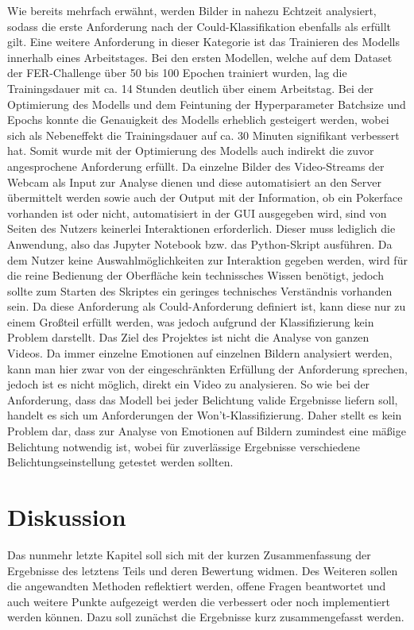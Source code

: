 \documentclass[12pt, a4paper]{report}
\begin{document}
Wie bereits mehrfach erwähnt, werden Bilder in nahezu Echtzeit analysiert, sodass die erste Anforderung nach der Could-Klassifikation ebenfalls als erfüllt gilt. Eine weitere Anforderung in dieser Kategorie ist das Trainieren des Modells innerhalb eines Arbeitstages. Bei den ersten Modellen, welche auf dem Dataset der FER-Challenge über 50 bis 100 Epochen trainiert wurden, lag die Trainingsdauer mit ca. 14 Stunden deutlich über einem Arbeitstag. Bei der Optimierung des Modells und dem Feintuning der Hyperparameter Batchsize und Epochs konnte die Genauigkeit des Modells erheblich gesteigert werden, wobei sich als Nebeneffekt die Trainingsdauer auf ca. 30 Minuten signifikant verbessert hat. Somit wurde mit der Optimierung des Modells auch indirekt die zuvor angesprochene Anforderung erfüllt. Da einzelne Bilder des Video-Streams der Webcam als Input zur Analyse dienen und diese automatisiert an den Server übermittelt werden sowie auch der Output mit der Information, ob ein Pokerface vorhanden ist oder nicht, automatisiert in der GUI ausgegeben wird, sind von Seiten des Nutzers keinerlei Interaktionen erforderlich. Dieser muss lediglich die Anwendung, also das Jupyter Notebook bzw. das Python-Skript ausführen. Da dem Nutzer keine Auswahlmöglichkeiten zur Interaktion gegeben werden, wird für die reine Bedienung der Oberfläche kein technissches Wissen benötigt, jedoch sollte zum Starten des Skriptes ein geringes technisches Verständnis vorhanden sein. Da diese Anforderung als Could-Anforderung definiert ist, kann diese nur zu einem Großteil erfüllt werden, was jedoch aufgrund der Klassifizierung kein Problem darstellt.\newline
Das Ziel des Projektes ist nicht die Analyse von ganzen Videos. Da immer einzelne Emotionen auf einzelnen Bildern analysiert werden, kann man hier zwar von der eingeschränkten Erfüllung der Anforderung sprechen, jedoch ist es nicht möglich, direkt ein Video zu analysieren. So wie bei der Anforderung, dass das Modell bei jeder Belichtung valide Ergebnisse liefern soll, handelt es sich um Anforderungen der Won't-Klassifizierung. Daher stellt es kein Problem dar, dass zur Analyse von Emotionen auf Bildern zumindest eine mäßige Belichtung notwendig ist, wobei für zuverlässige Ergebnisse verschiedene Belichtungseinstellung getestet werden sollten.

\let\cleardoublepage\relax
\chapter{Diskussion}
Das nunmehr letzte Kapitel soll sich mit der kurzen Zusammenfassung der Ergebnisse des letztens Teils und deren Bewertung widmen. 
Des Weiteren sollen die angewandten Methoden reflektiert werden,
offene Fragen beantwortet und auch weitere Punkte aufgezeigt werden die verbessert oder noch implementiert werden können. Dazu soll zunächst die Ergebnisse kurz zusammengefasst werden.
\end{document}
